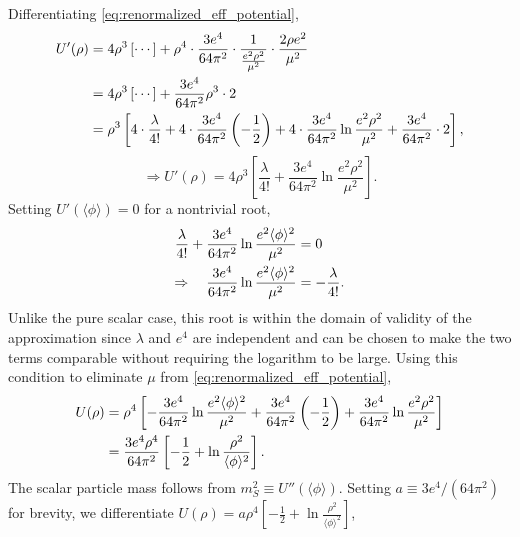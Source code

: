 Differentiating \eqref{eq:renormalized_eff_potential},
\begin{align}
	U'(\rho) & = 4\rho^3\left[\cdots\right]
	+ \rho^4\cdot\frac{3e^4}{64\pi^2}\cdot
	\frac{1}{\frac{e^2\rho^2}{\mu^2}}\cdot\frac{2\rho e^2}{\mu^2}
	\notag                                                                    \\
	         & = 4\rho^3\left[\cdots\right]
	+ \frac{3e^4}{64\pi^2}\rho^3\cdot 2 \notag                                \\
	         & = \rho^3\left[4\cdot\frac{\lambda}{4!}
		                   + 4\cdot\frac{3e^4}{64\pi^2}\left(-\frac{1}{2}\right)
		                   + 4\cdot\frac{3e^4}{64\pi^2}\ln\frac{e^2\rho^2}{\mu^2}
		                   + \frac{3e^4}{64\pi^2}\cdot 2\right],
\end{align}
\begin{equation}
	\Rightarrow U'(\rho) = 4\rho^3\left[\frac{\lambda}{4!}
		+ \frac{3e^4}{64\pi^2}\ln\frac{e^2\rho^2}{\mu^2}\right].
\end{equation}
Setting $U'(\langle\phi\rangle) = 0$ for a nontrivial root,
\begin{align}
	\frac{\lambda}{4!}
	+ \frac{3e^4}{64\pi^2}\ln\frac{e^2\langle\phi\rangle^2}{\mu^2}
	 & = 0 \notag             \\
	\Rightarrow\quad
	\frac{3e^4}{64\pi^2}\ln\frac{e^2\langle\phi\rangle^2}{\mu^2}
	 & = -\frac{\lambda}{4!}.
\end{align}
Unlike the pure scalar case, this root is within the domain of validity
of the approximation since $\lambda$ and $e^4$ are independent and can
be chosen to make the two terms comparable without requiring the
logarithm to be large. Using this condition to eliminate $\mu$ from
\eqref{eq:renormalized_eff_potential},
\begin{align}
	U(\rho) & = \rho^4\left[-\frac{3e^4}{64\pi^2}
		                  \ln\frac{e^2\langle\phi\rangle^2}{\mu^2}
		                  + \frac{3e^4}{64\pi^2}\left(-\frac{1}{2}\right)
		                  + \frac{3e^4}{64\pi^2}\ln\frac{e^2\rho^2}{\mu^2}\right]
	\notag                                                                                  \\
	        & = \frac{3e^4\rho^4}{64\pi^2}\left[-\frac{1}{2}
		                                      + \ln\frac{\rho^2}{\langle\phi\rangle^2}\right].
\end{align}
The scalar particle mass follows from $m_S^2 \equiv U''(\langle\phi\rangle)$.
Setting $a\equiv 3e^4/(64\pi^2)$ for brevity, we differentiate
$U(\rho) = a\rho^4\left[-\frac{1}{2}+\ln\frac{\rho^2}{\langle\phi\rangle^2}\right]$,
